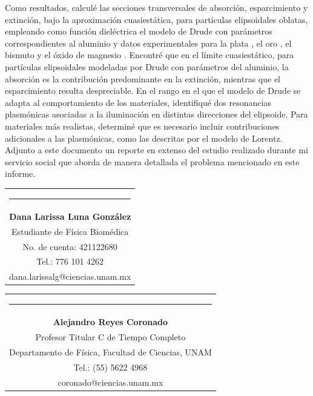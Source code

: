 \documentclass[9pt,letterpaper]{article}
\begin{document}
Como resultados, calculé las secciones transversales de absorción, esparcimiento y extinción, bajo la aproximación cuasiestática, para partículas elipsoidales oblatas, empleando como función dieléctrica el modelo de Drude con parámetros correspondientes al aluminio \cite{Plasmonics} y datos experimentales para la plata \cite{Plata}, el oro \cite{Plata}, el bismuto \cite{Bismuto} y el óxido de magnesio \cite{MgO}. Encontré que en el límite cuasiestático, para partículas elipsoidales modeladas por Drude con parámetros del aluminio, la absorción es la contribución predominante en la extinción, mientras que el esparcimiento resulta despreciable. En el rango en el que el modelo de Drude se adapta al comportamiento de los materiales, identifiqué dos resonancias plasmónicas asociadas a
la iluminación en distintas direcciones del elipsoide. Para materiales más realistas, determiné que es necesario incluir contribuciones adicionales a las plasmónicas, como las descritas por el modelo de Lorentz. \\

Adjunto a este documento un reporte en extenso del estudio realizado durante mi servicio social que aborda de manera detallada el problema mencionado en este informe.	\\

\bigskip

	{\vspace{2.55cm}\begin{tabular} { c}
			\setlength{\tabcolsep}{15pt}
			\renewcommand{\arraystretch}{1}
			\noindent\rule{5.5cm}{0.4pt}\qquad \\
			
			\qquad  \textbf{Dana Larissa Luna González} \qquad \\
			\qquad Estudiante de Física Biomédica  \qquad \\ \qquad 
			No. de cuenta: 421122680\qquad \\  
			\qquad  Tel.: 776 101 4262 \qquad \\
			\qquad dana.larissalg@ciencias.unam.mx \qquad \\
			
		\end{tabular}
	}
	
	{\vspace{-2.53cm}\hspace{7cm}\begin{tabular} { c}
			\setlength{\tabcolsep}{15pt}
			\renewcommand{\arraystretch}{1}
			\noindent\rule{5.5cm}{0.4pt}\qquad \\
			
			\qquad  \textbf{Alejandro Reyes Coronado} \qquad \\
			\qquad Profesor Titular C de Tiempo Completo  \qquad \\  
			\qquad Departamento de Física, Facultad de Ciencias, UNAM\qquad \\ 
			\qquad  Tel.: (55) 5622 4968 \qquad \\
			\qquad coronado@ciencias.unam.mx \qquad \\
			
		\end{tabular}
		
	}
	
\end{document}
